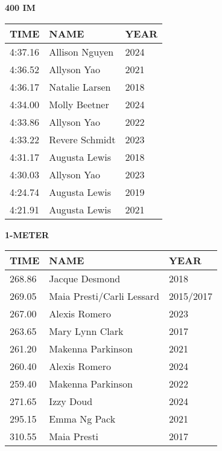 \begin{center}
\begin{minipage}[t]{0.7\textwidth}
\centering
\textbf{400 IM}\\[0.05cm]
\begin{tabular}{@{}p{1.8cm}p{2.8cm}p{1.2cm}@{}}
\hline
\textbf{TIME} & \textbf{NAME} & \textbf{YEAR} \\
\hline
4:37.16 & Allison Nguyen & 2024 \\
4:36.52 & Allyson Yao & 2021 \\
4:36.17 & Natalie Larsen & 2018 \\
4:34.00 & Molly Beetner & 2024 \\
4:33.86 & Allyson Yao & 2022 \\
4:33.22 & Revere Schmidt & 2023 \\
4:31.17 & Augusta Lewis & 2018 \\
4:30.03 & Allyson Yao & 2023 \\
4:24.74 & Augusta Lewis & 2019 \\
4:21.91 & Augusta Lewis & 2021 \\
\hline
\end{tabular}
\end{minipage}
\end{center}

\vspace{0.4cm}

\begin{center}
\begin{minipage}[t]{0.7\textwidth}
\centering
\textbf{1-METER}\\[0.05cm]
\begin{tabular}{@{}p{1.8cm}p{2.8cm}p{1.2cm}@{}}
\hline
\textbf{TIME} & \textbf{NAME} & \textbf{YEAR} \\
\hline
268.86 & Jacque Desmond & 2018 \\
269.05 & Maia Presti/Carli Lessard & 2015/2017 \\
267.00 & Alexis Romero & 2023 \\
263.65 & Mary Lynn Clark & 2017 \\
261.20 & Makenna Parkinson & 2021 \\
260.40 & Alexis Romero & 2024 \\
259.40 & Makenna Parkinson & 2022 \\
271.65 & Izzy Doud & 2024 \\
295.15 & Emma Ng Pack & 2021 \\
310.55 & Maia Presti & 2017 \\
\hline
\end{tabular}
\end{minipage}
\end{center}

